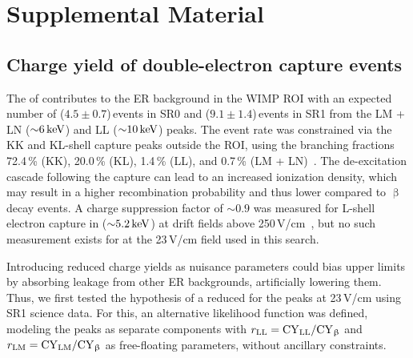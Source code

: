 \documentclass[
    reprint,
    superscriptaddress,
    aps, prl,
    amsmath,amssymb,
    twocolumn,
    showkeys,
    floatfix,
    nofootinbib,
]{revtex4-2}
\begin{document}
\appendix
\section{Supplemental Material}
\setcounter{equation}{0}
\setcounter{page}{1}
\makeatletter
\renewcommand{\theequation}{S\arabic{equation}}
\renewcommand{\thefigure}{S\the\numexpr\value{figure}-4\relax} %
\renewcommand{\thetable}{S\the\numexpr\value{table}-1\relax}

\subsection{Charge yield of  double-electron capture events}
\label{sec:dec}
The \dec of  contributes to the ER background in the WIMP ROI with an expected number of ($4.5\pm 0.7$)\,events in SR0 and ($9.1\pm1.4$)\,events in SR1 from the LM + LN ($\SI{\sim 6}{\kilo\electronvolt}$) and LL ($\SI{\sim 10}{\kilo\electronvolt}$) peaks.
The event rate was constrained via the KK and KL-shell capture peaks outside the ROI, using the branching fractions 72.4\,\% (KK), 20.0\,\% (KL), 1.4\,\% (LL), and 0.7\,\% (LM + LN)~\cite{XENON:2022evz}.
The de-excitation cascade following the capture can lead to an increased ionization density, which may result in a higher recombination probability and thus lower \chargeyield compared to $\upbeta$ decay events.
A charge suppression factor of $\sim0.9$ was measured for L-shell electron capture in  ($\SI{\sim 5.2}{\kilo\electronvolt}$) at drift fields above 250\,V/cm~\cite{xelda_ec_2021},
but no such measurement exists for \dec at the 23\,V/cm field used in this search.

Introducing reduced charge yields as nuisance parameters could bias upper limits by absorbing leakage from other ER backgrounds, artificially lowering them.
Thus, we first tested the hypothesis of a reduced \chargeyield for the \dec peaks at 23\,V/cm using SR1 science data.
For this, an alternative likelihood function was defined, modeling the \dec peaks as separate components with $r_{\mathrm{LL}} = \mathrm{\mathrm{CY}_{LL}}/\mathrm{\mathrm{CY}}_\upbeta$ and $r_{\mathrm{LM}} = \mathrm{\mathrm{CY}_{LM}}/\mathrm{\mathrm{CY}}_\upbeta$ as free-floating parameters, without ancillary constraints.
\end{document}
